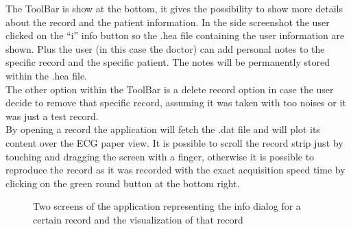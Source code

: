 The ToolBar is show at the bottom, it gives the possibility to show more details about the record and the patient information. In the side screenshot the user clicked on the “i” info button so the .hea file containing the user information are shown. Plus the user (in this case the doctor) can add personal notes to the specific record and the specific patient. The notes will be permanently stored within the .hea file.\\
The other option within the ToolBar is a delete record option in case the user decide to remove that specific record, assuming it was taken with too noises or it was just a test record.\\
By opening a record the application will fetch the .dat file and will plot its content over the ECG paper view. It is possible to scroll the record strip just by touching and dragging the screen with a finger, otherwise it is possible to reproduce the record as it was recorded with the exact acquisition speed time by clicking on the green round button at the bottom right.
\newpage
\begin{figure}[!htb]
	\centering
	\qquad 
	\caption{Two screens of the application representing the info dialog for a certain record and the visualization of that record}  
	\label{fig10.7ab}
\end{figure}
